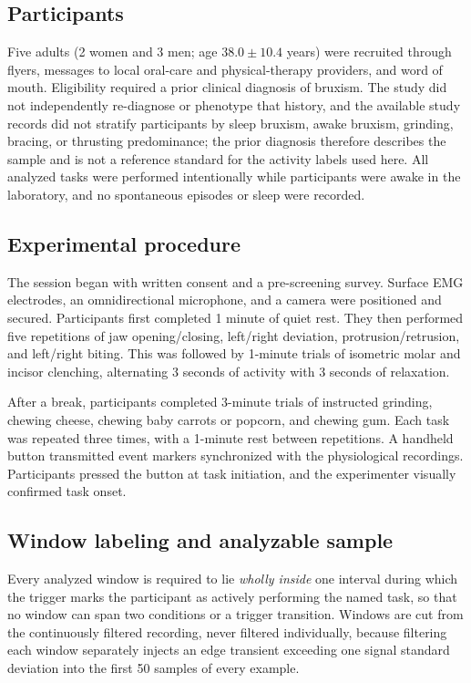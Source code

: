 \documentclass[pdflatex,sn-nature,iicol]{sn-jnl}
\begin{document}
\subsection{Participants}

Five adults (2 women and 3 men; age $38.0 \pm 10.4$ years) were recruited through flyers, messages to local oral-care and physical-therapy providers, and word of mouth. Eligibility required a prior clinical diagnosis of bruxism. The study did not independently re-diagnose or phenotype that history, and the available study records did not stratify participants by sleep bruxism, awake bruxism, grinding, bracing, or thrusting predominance; the prior diagnosis therefore describes the sample and is not a reference standard for the activity labels used here. All analyzed tasks were performed intentionally while participants were awake in the laboratory, and no spontaneous episodes or sleep were recorded.

\subsection{Experimental procedure}

The session began with written consent and a pre-screening survey. Surface EMG electrodes, an omnidirectional microphone, and a camera were positioned and secured. Participants first completed 1 minute of quiet rest. They then performed five repetitions of jaw opening/closing, left/right deviation, protrusion/retrusion, and left/right biting. This was followed by 1-minute trials of isometric molar and incisor clenching, alternating 3 seconds of activity with 3 seconds of relaxation.

After a break, participants completed 3-minute trials of instructed grinding, chewing cheese, chewing baby carrots or popcorn, and chewing gum. Each task was repeated three times, with a 1-minute rest between repetitions. A handheld button transmitted event markers synchronized with the physiological recordings. Participants pressed the button at task initiation, and the experimenter visually confirmed task onset.

\subsection{Window labeling and analyzable sample}

Every analyzed window is required to lie \emph{wholly inside} one interval during which the trigger marks the participant as actively performing the named task, so that no window can span two conditions or a trigger transition. Windows are cut from the continuously filtered recording, never filtered individually, because filtering each window separately injects an edge transient exceeding one signal standard deviation into the first 50 samples of every example.
\end{document}
